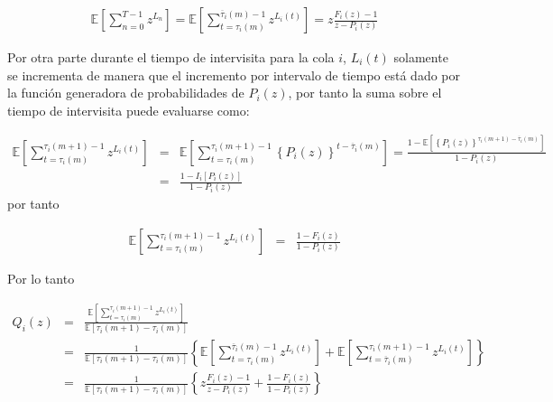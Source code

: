 \documentclass{article}
\newcommand{\esp}{\mathbb{E}}
\begin{document}
\begin{eqnarray}\label{Eq.Arribos.Primera}
\esp\left[\sum_{n=0}^{T-1}z^{L_{n}}\right]=
\esp\left[\sum_{t=\tau_{i}\left(m\right)}^{\overline{\tau}_{i}\left(m\right)-1}z^{L_{i}\left(t\right)}\right]
=z\frac{F_{i}\left(z\right)-1}{z-P_{i}\left(z\right)}
\end{eqnarray}

Por otra parte durante el tiempo de intervisita para la cola $i$, $L_{i}\left(t\right)$ solamente se incrementa de manera que el incremento por intervalo de tiempo est\'a dado por la funci\'on generadora de probabilidades de $P_{i}\left(z\right)$, por tanto la suma sobre el tiempo de intervisita puede evaluarse como:

\begin{eqnarray*}
\esp\left[\sum_{t=\tau_{i}\left(m\right)}^{\tau_{i}\left(m+1\right)-1}z^{L_{i}\left(t\right)}\right]&=&\esp\left[\sum_{t=\tau_{i}\left(m\right)}^{\tau_{i}\left(m+1\right)-1}\left\{P_{i}\left(z\right)\right\}^{t-\overline{\tau}_{i}\left(m\right)}\right]=\frac{1-\esp\left[\left\{P_{i}\left(z\right)\right\}^{\tau_{i}\left(m+1\right)-\overline{\tau}_{i}\left(m\right)}\right]}{1-P_{i}\left(z\right)}\\
&=&\frac{1-I_{i}\left[P_{i}\left(z\right)\right]}{1-P_{i}\left(z\right)}
\end{eqnarray*}
por tanto

\begin{eqnarray*}
\esp\left[\sum_{t=\tau_{i}\left(m\right)}^{\tau_{i}\left(m+1\right)-1}z^{L_{i}\left(t\right)}\right]&=&
\frac{1-F_{i}\left(z\right)}{1-P_{i}\left(z\right)}
\end{eqnarray*}

Por lo tanto

\begin{eqnarray*}
Q_{i}\left(z\right)&=&\frac{\esp\left[\sum_{t=\tau_{i}\left(m\right)}^{\tau_{i}
\left(m+1\right)-1}z^{L_{i}\left(t\right)}\right]}{\esp\left[\tau_{i}\left(m+1\right)-\tau_{i}\left(m\right)\right]}\\
&=&\frac{1}{\esp\left[\tau_{i}\left(m+1\right)-\tau_{i}\left(m\right)\right]}
\left\{
\esp\left[\sum_{t=\tau_{i}\left(m\right)}^{\overline{\tau}_{i}\left(m\right)-1}
z^{L_{i}\left(t\right)}\right]
+\esp\left[\sum_{t=\overline{\tau}_{i}\left(m\right)}^{\tau_{i}\left(m+1\right)-1}
z^{L_{i}\left(t\right)}\right]\right\}\\
&=&\frac{1}{\esp\left[\tau_{i}\left(m+1\right)-\tau_{i}\left(m\right)\right]}
\left\{
z\frac{F_{i}\left(z\right)-1}{z-P_{i}\left(z\right)}+\frac{1-F_{i}\left(z\right)}
{1-P_{i}\left(z\right)}
\right\}
\end{eqnarray*}
\end{document}
